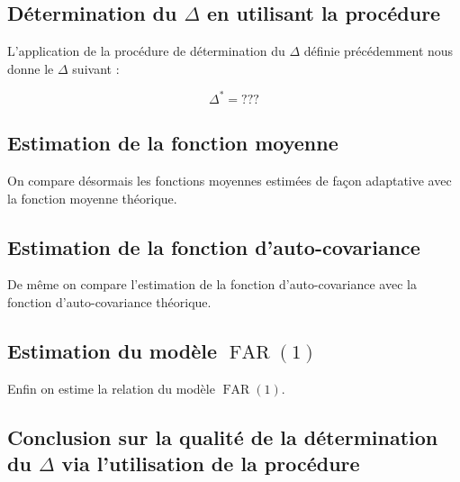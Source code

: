 
\subsection{Détermination du $\Delta$ en utilisant la procédure}

L'application de la procédure de détermination du $\Delta$ définie précédemment nous donne le $\Delta$ suivant :

\begin{equation*}
  \Delta^* = ???
\end{equation*}

\subsection{Estimation de la fonction moyenne}

On compare désormais les fonctions moyennes estimées de façon adaptative avec la fonction moyenne théorique.


\subsection{Estimation de la fonction d'auto-covariance}

De même on compare l'estimation de la fonction d'auto-covariance avec la fonction d'auto-covariance théorique.


\subsection{Estimation du modèle $\operatorname{FAR}(1)$}

Enfin on estime la relation du modèle $\operatorname{FAR}(1)$.




\subsection{Conclusion sur la qualité de la détermination du $\Delta$ via l'utilisation de la procédure}

